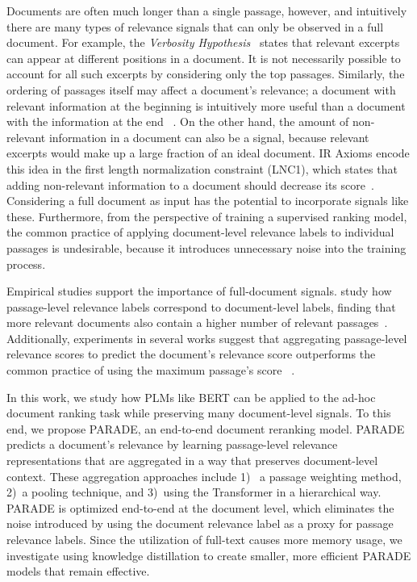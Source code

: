 \documentclass[11pt,a4paper]{article}
\begin{document}
Documents are often much longer than a single passage, however, and intuitively there are many types of relevance signals that can only be observed in a full document.
For example, the {\it Verbosity Hypothesis}~\cite{DBLP:conf/sigir/RobertsonW94} states that relevant excerpts can appear at different positions in a document.
It is not necessarily possible to account for all such excerpts by considering only the top passages. Similarly, the ordering of passages itself may affect a document's relevance; a document with relevant information at the beginning is intuitively more useful than a document with the information at the end ~\cite{DBLP:conf/wsdm/HuiYBM18}. On the other hand, the amount of non-relevant information in a document can also be a signal, because relevant excerpts would make up a large fraction of an ideal document.
IR Axioms encode this idea in the first length normalization constraint (LNC1), which states that adding non-relevant information to a document should decrease its score~\cite{10.1145/1961209.1961210}.
Considering a full document as input has the potential to incorporate signals like these.
Furthermore, from the perspective of training a supervised ranking model, the common practice of applying document-level relevance labels to individual passages is undesirable, because it introduces unnecessary noise into the training process.

Empirical studies support the importance of full-document signals.
\citeauthor{DBLP:conf/sigir/WuML0M19} study how passage-level relevance labels correspond to document-level labels, finding that more relevant documents also contain a higher number of relevant passages~\cite{DBLP:conf/sigir/WuML0M19}.
Additionally, experiments in several works suggest that aggregating passage-level relevance scores to predict the document's relevance score outperforms the common practice of using the maximum passage's score ~\cite{DBLP:conf/ecir/BenderskyK08,DBLP:conf/sigir/FanGLXZC18,DBLP:conf/ecir/AiOC18}.



In this work, we study how PLMs like BERT can be applied to the ad-hoc document ranking task while preserving many document-level signals.
To this end, we propose PARADE, an end-to-end document reranking model.
PARADE predicts a document's relevance by learning passage-level relevance representations that are aggregated in a way that preserves document-level context.
These aggregation approaches include 1)~ a passage weighting method, 2)~a pooling technique, and 3)~using the Transformer in a hierarchical way. 
PARADE is optimized end-to-end at the document level, which eliminates the noise introduced by using the document relevance label as a proxy for passage relevance labels.
Since the utilization of full-text causes more memory usage, we investigate using knowledge distillation to create smaller, more efficient PARADE models that remain effective.
\end{document}
